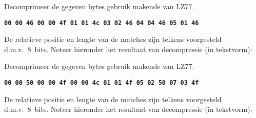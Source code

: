 \documentclass[]{pvm-exam}
\newcommand{\hex}[1]{\texttt{\bfseries #1}}
\begin{document}
\begin{question}
  Decomprimeer de gegeven bytes gebruik makende van LZ77.
  \begin{center}
    \hex{00 00 46 00 00 4f 01 01 4c 03 02 46 04 04 46 05 01 46}
  \end{center}
  De relatieve positie en lengte van de matches zijn telkens voorgesteld d.m.v.~8~bits.
  Noteer hieronder het resultaat van decompressie (in tekstvorm):
  \vskip5mm
  \begin{center}
  \end{center}
\end{question}

\begin{question}
  Decomprimeer de gegeven bytes gebruik makende van LZ77.
  \begin{center}
    \hex{00 00 50 00 00 4f 00 00 4c 01 01 4f 05 02 50 07 03 4f}
  \end{center}
  De relatieve positie en lengte van de matches zijn telkens voorgesteld d.m.v.~8~bits.
  Noteer hieronder het resultaat van decompressie (in tekstvorm):
  \vskip5mm
  \begin{center}
  \end{center}
\end{question}


\end{document}
